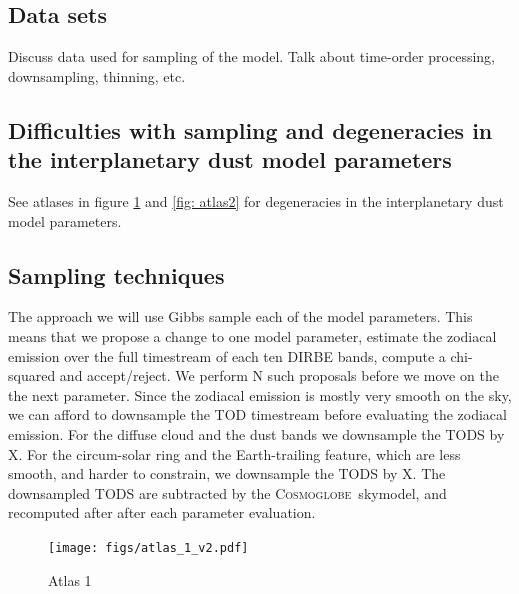 \documentclass{aa}
\def\Cosmoglobe{\textsc{Cosmoglobe}}
\begin{document}
\subsection{Data sets}
Discuss data used for sampling of the model. Talk about time-order processing, downsampling, thinning, etc.

\subsection{Difficulties with sampling and degeneracies in the interplanetary dust model parameters}
See atlases in figure \ref{fig: atlas1} and \ref{fig: atlas2} for degeneracies in the interplanetary dust model parameters.

\subsection{Sampling techniques}
The approach we will use Gibbs sample each of the model parameters. This means that we propose a change to one model parameter, estimate the zodiacal emission over the full timestream of each ten DIRBE bands, compute a chi-squared and accept/reject. We perform N such proposals before we move on the the next parameter. Since the zodiacal emission is mostly very smooth on the sky, we can afford to downsample the TOD timestream before evaluating the zodiacal emission. For the diffuse cloud and the dust bands we downsample the TODS by X. For the circum-solar ring and the Earth-trailing feature, which are less smooth, and harder to constrain, we downsample the TODS by X. The downsampled TODS are subtracted by the \Cosmoglobe\ skymodel, and recomputed after after each parameter evaluation. 

\begin{figure}
  \centering
   	\texttt{[image: figs/atlas\_1\_v2.pdf]}
  	\caption{Atlas 1}
	\label{fig: atlas1}
\end{figure}
\end{document}

